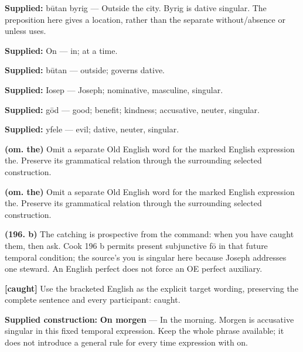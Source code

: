 \textbf{Supplied:} būtan byrig — Outside the city. Byrig is dative singular. The preposition here gives a location, rather than the separate without/\allowbreak{}absence or unless uses.

\textbf{Supplied:} On — in; at a time.

\textbf{Supplied:} būtan — outside; governs dative.

\textbf{Supplied:} Iosep — Joseph; nominative, masculine, singular.

\textbf{Supplied:} gōd — good; benefit; kindness; accusative, neuter, singular.

\textbf{Supplied:} yfele — evil; dative, neuter, singular.

\textbf{(om. the)} Omit a separate Old English word for the marked English expression the. Preserve its grammatical relation through the surrounding selected construction.

\textbf{(om. the)} Omit a separate Old English word for the marked English expression the. Preserve its grammatical relation through the surrounding selected construction.

\textbf{(196. b)} The catching is prospective from the command: when you have caught them, then ask. Cook 196 b permits present subjunctive fō in that future temporal condition; the source’s you is singular here because Joseph addresses one steward. An English perfect does not force an OE perfect auxiliary.

\textbf{[caught]} Use the bracketed English as the explicit target wording, preserving the complete sentence and every participant: caught.

\textbf{Supplied construction:} \textbf{On morgen} — In the morning. Morgen is accusative singular in this fixed temporal expression. Keep the whole phrase available; it does not introduce a general rule for every time expression with on.


